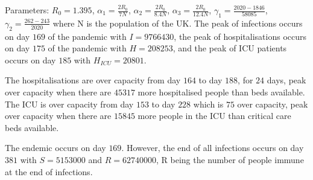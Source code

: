 \documentclass[11pt]{article}
\begin{document}
Parameters: $R_0=1.395$, $\alpha_1=\frac{2R_0}{7N}$, $\alpha_2=\frac{2R_0}{8.4N}$, $\alpha_3=\frac{2R_0}{12.4N}$, $\gamma_1=\frac{2020-1846}{58085}$, $\gamma_2=\frac{262-243}{2020}$ where N is the population of the UK. The peak of infections occurs on day $169$ of the pandemic with $I=9766430$, the peak of hospitalisations occurs on day $175$ of the pandemic with $H=208253$, and the peak of ICU patients occurs on day $185$ with $H_{ICU}=20801$. \par 
The hospitalisations are over capacity from day $164$ to day $188$, for $24$ days, peak over capacity when there are $45317$ more hospitalised people than beds available. The ICU is over capacity from day $153$ to day $228$ which is $75$ over capacity, peak over capacity when there are $ 15845$ more people in the ICU than critical care beds available. \par
The endemic occurs on day $169$. However, the end of all infections occurs on day $381$ with $S=5153000$ and $R=62740000$, R being the number of people immune at the end of infections.
\end{document}
